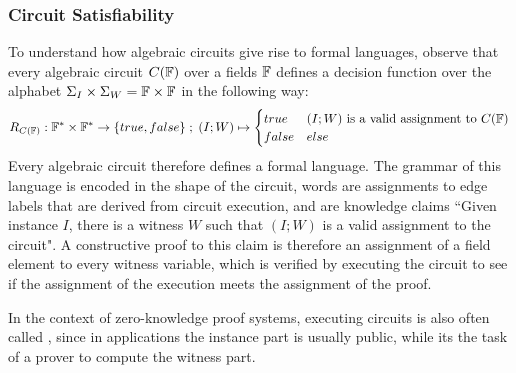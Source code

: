 \subsubsection{Circuit Satisfiability}
\label{circuit-satisfiability} To understand how algebraic circuits give rise to formal languages, observe that every algebraic circuit $C(\mathbb{F})$ over a fields $\mathbb{F}$ defines a decision function over the alphabet $\Sigma_I \times \Sigma_W = \mathbb{F} \times \mathbb{F}$ in the following way:
\begin{equation}
R_{C(\mathbb{F})} : \mathbb{F}^* \times \mathbb{F}^* \to \{true, false\}\;;\;
(I;W) \mapsto
\begin{cases}
true & (I;W) \text{ is a valid assignment to } C(\mathbb{F})\\
false & else
\end{cases}
\end{equation}
Every algebraic circuit therefore defines a formal language. The grammar of this language is encoded in the shape of the circuit, words are assignments to edge labels that are derived from circuit execution, and  are knowledge claims ``Given instance $I$, there is a witness $W$ such that $(I;W)$ is a valid assignment to the circuit". A constructive proof to this claim is therefore an assignment of a field element to every witness variable, which is verified by executing the circuit to see if the assignment of the execution meets the assignment of the proof. 

In the context of zero-knowledge proof systems, executing circuits is also often called , since in applications the instance part is usually public, while its the task of a prover to compute the witness part.

